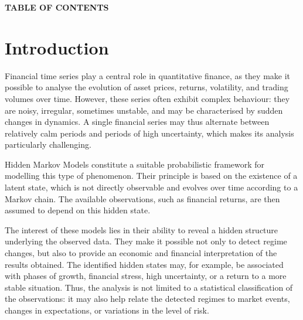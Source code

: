 \documentclass[11pt]{article}
\begin{document}
\setcounter{page}{1}


\vspace{1cm}

\thispagestyle{fancy}

\begin{center}
    {\LARGE \textbf{TABLE OF CONTENTS}}
\end{center}

\vspace{0.5cm}

\tableofcontents

\newpage


\newpage

\section{Introduction}


Financial time series play a central role in quantitative finance, as they make it possible to analyse the evolution of asset prices, returns, volatility, and trading volumes over time. However, these series often exhibit complex behaviour: they are noisy, irregular, sometimes unstable, and may be characterised by sudden changes in dynamics. A single financial series may thus alternate between relatively calm periods and periods of high uncertainty, which makes its analysis particularly challenging.

Hidden Markov Models constitute a suitable probabilistic framework for modelling this type of phenomenon. Their principle is based on the existence of a latent state, which is not directly observable and evolves over time according to a Markov chain. The available observations, such as financial returns, are then assumed to depend on this hidden state. 

The interest of these models lies in their ability to reveal a hidden structure underlying the observed data. They make it possible not only to detect regime changes, but also to provide an economic and financial interpretation of the results obtained. The identified hidden states may, for example, be associated with phases of growth, financial stress, high uncertainty, or a return to a more stable situation. Thus, the analysis is not limited to a statistical classification of the observations: it may also help relate the detected regimes to market events, changes in expectations, or variations in the level of risk.
\end{document}

